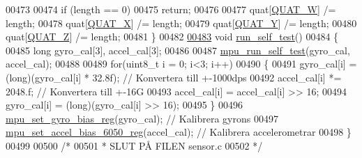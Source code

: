 \begin{DoxyCode}
00473 
00474     \textcolor{keywordflow}{if} (length == 0)
00475     \textcolor{keywordflow}{return};
00476 
00477     quat[\hyperlink{sensor_8h_a3cff338e3722c1c1a36de82d2a953bd3}{QUAT\_W}] /= length;
00478     quat[\hyperlink{sensor_8h_a470e1c82469f8e4f20d039de634a5360}{QUAT\_X}] /= length;
00479     quat[\hyperlink{sensor_8h_ac7215623b05131650c8a16e4326f3734}{QUAT\_Y}] /= length;
00480     quat[\hyperlink{sensor_8h_a4ed90c13353e0d8ceb2f74ea3070fe11}{QUAT\_Z}] /= length;
00481 \}
00482 
\hypertarget{sensor_8c_source.tex_l00483}{}\hyperlink{sensor_8h_abf51091638bfe4a1e4479fa12a95b0a9}{00483} \textcolor{keywordtype}{void} \hyperlink{sensor_8c_abf51091638bfe4a1e4479fa12a95b0a9}{run\_self\_test}()
00484 \{
00485     \textcolor{keywordtype}{long} gyro\_cal[3], accel\_cal[3];
00486 
00487     \hyperlink{group___d_r_i_v_e_r_s_ga3773dc98eb1ba15da0091ae75abcf62f}{mpu\_run\_self\_test}(gyro\_cal, accel\_cal);
00488 
00489     \textcolor{keywordflow}{for}(uint8\_t i = 0; i<3; i++)
00490     \{
00491         gyro\_cal[i] = (long)(gyro\_cal[i] * 32.8f);          \textcolor{comment}{// Konvertera till +-1000dps}
00492         accel\_cal[i] *= 2048.f;                             \textcolor{comment}{// Konvertera till +-16G}
00493         accel\_cal[i] = accel\_cal[i] >> 16;
00494         gyro\_cal[i] = (long)(gyro\_cal[i] >> 16);
00495     \}
00496     \hyperlink{group___d_r_i_v_e_r_s_ga01361a0f5c1f048cb0742bd3d0e4d3a5}{mpu\_set\_gyro\_bias\_reg}(gyro\_cal);                       \textcolor{comment}{// Kalibrera gyrons}
00497     \hyperlink{group___d_r_i_v_e_r_s_gae2eb5073dacc7455101bf6818e35c40a}{mpu\_set\_accel\_bias\_6050\_reg}(accel\_cal);                  \textcolor{comment}{// Kalibrera
       accelerometrar}
00498 \}
00499 
00500 \textcolor{comment}{/*}
00501 \textcolor{comment}{* SLUT PÅ FILEN sensor.c}
00502 \textcolor{comment}{*/}
\end{DoxyCode}

